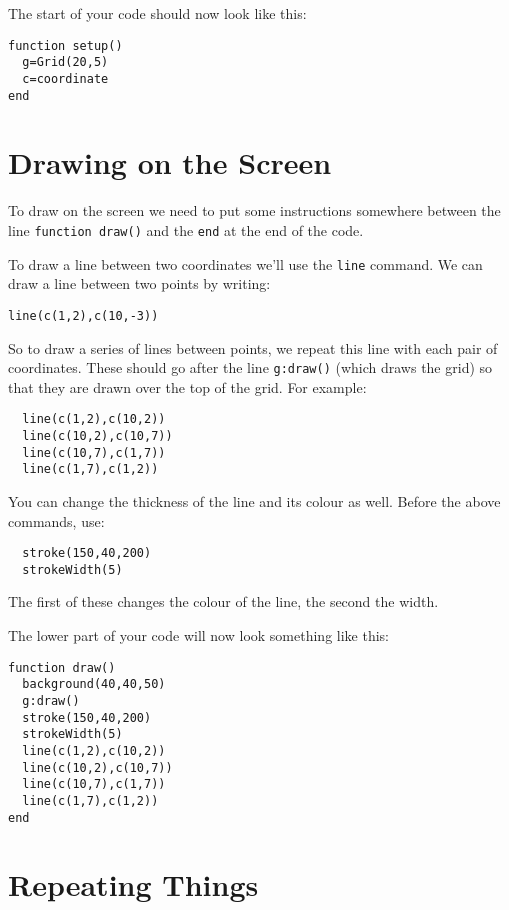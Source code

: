 \documentclass[
  xhtml,%
  text
]{internet}
\begin{document}
The start of your code should now look like this:

\begin{verbatim}
function setup()
  g=Grid(20,5)
  c=coordinate
end
\end{verbatim}

\section*{Drawing on the Screen}

To draw on the screen we need to put some instructions somewhere between the line \verb+function draw()+ and the \verb+end+ at the end of the code.

To draw a line between two coordinates we'll use the \verb+line+ command.
We can draw a line between two points by writing:

\begin{verbatim}
line(c(1,2),c(10,-3))
\end{verbatim}

So to draw a series of lines between points, we repeat this line with each pair of coordinates.
These should go after the line \verb+g:draw()+ (which draws the grid) so that they are drawn over the top of the grid.
For example:

\begin{verbatim}
  line(c(1,2),c(10,2))
  line(c(10,2),c(10,7))
  line(c(10,7),c(1,7))
  line(c(1,7),c(1,2))
\end{verbatim}

You can change the thickness of the line and its colour as well.
Before the above commands, use:

\begin{verbatim}
  stroke(150,40,200)
  strokeWidth(5)
\end{verbatim}

The first of these changes the colour of the line, the second the width.

The lower part of your code will now look something like this:

\begin{verbatim}
function draw()
  background(40,40,50)
  g:draw()
  stroke(150,40,200)
  strokeWidth(5)
  line(c(1,2),c(10,2))
  line(c(10,2),c(10,7))
  line(c(10,7),c(1,7))
  line(c(1,7),c(1,2))
end
\end{verbatim}

\section*{Repeating Things}
\end{document}
